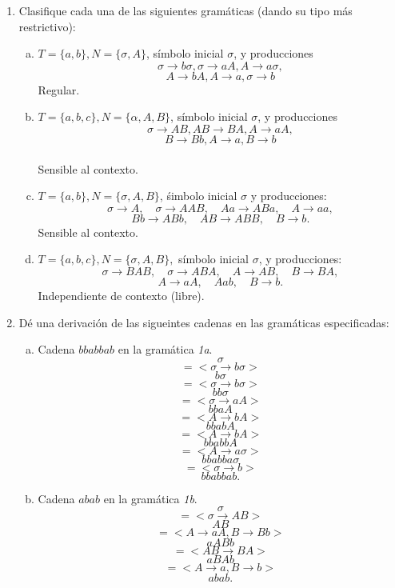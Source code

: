 \documentclass{article}
\begin{document}
\begin{enumerate}[1.]
\item
Clasifique cada una de las siguientes gramáticas (dando su tipo más restrictivo):
  \begin{enumerate}[a)]
    \item
      $T = \{ a,b\}, N = \{ \sigma, A\}$, símbolo inicial $\sigma$, y producciones
      \[ \sigma \rightarrow b\sigma, \sigma \rightarrow aA, A \rightarrow a\sigma,\]
      \[ A \rightarrow bA, A \rightarrow a, \sigma \rightarrow b\]
      Regular.
    \item 
      $T = \{ a,b,c \}, N = \{ \alpha,A,B\}$, símbolo inicial $\sigma$, y producciones
      \[ \sigma \rightarrow AB, AB \rightarrow BA, A \rightarrow aA,\]
      \[ B \rightarrow Bb, A \rightarrow a, B \rightarrow b\] \\
       Sensible al contexto.
    \item
      $T = \{ a,b\}, N = \{ \sigma, A,B\}$, śimbolo inicial $\sigma$ y producciones:
      \[ \sigma \rightarrow A, \quad \sigma \rightarrow AAB,\quad Aa \rightarrow ABa, \quad A \rightarrow aa,\]
      \[ Bb \rightarrow ABb, \quad AB \rightarrow ABB, \quad B \rightarrow b.\]
      Sensible al contexto.
    \item
      $T = \{ a,b,c \}, N = \{\sigma,A,B \},$ símbolo inicial $\sigma$, y producciones:
      \[ \sigma \rightarrow BAB, \quad \sigma \rightarrow ABA, \quad A \rightarrow AB, \quad B \rightarrow BA,\]
      \[A \rightarrow aA, \quad A ab, \quad B \rightarrow b.\]
      Independiente de contexto (libre).
  \end{enumerate}
\item
  Dé una derivación de las sigueintes cadenas en las gramáticas especificadas:
    \begin{enumerate}[a)]
      \item 
        Cadena $bbabbab$ en la gramática \textit{1a}.
        \[ \sigma \]
        \[ = < \sigma \rightarrow b\sigma >\]
        \[ b\sigma \]
        \[ = < \sigma \rightarrow b\sigma > \]
        \[ bb\sigma \]
        \[ = < \sigma \rightarrow aA > \]
        \[ bbaA \]
        \[ = < A \rightarrow bA > \]
        \[ bbabA \]
        \[ = < A \rightarrow bA > \]
        \[ bbabbA \]
        \[ = <A \rightarrow a\sigma> \]
        \[ bbabba\sigma\]
        \[ = <\sigma \rightarrow b> \]
        \[ bbabbab. \]
      \item
        Cadena $abab$ en la gramática \textit{1b}.
        \[ \sigma \]
        \[ = < \sigma \rightarrow AB> \]
        \[ AB \]
        \[ = <A \rightarrow aA, B \rightarrow Bb>\]
        \[ aABb \]
        \[ = < AB \rightarrow BA > \]
        \[ aBAb \]
        \[ = <A \rightarrow a, B \rightarrow b> \]
        \[ abab. \] \\ \\
    \end{enumerate}
\end{enumerate}
\end{document}
